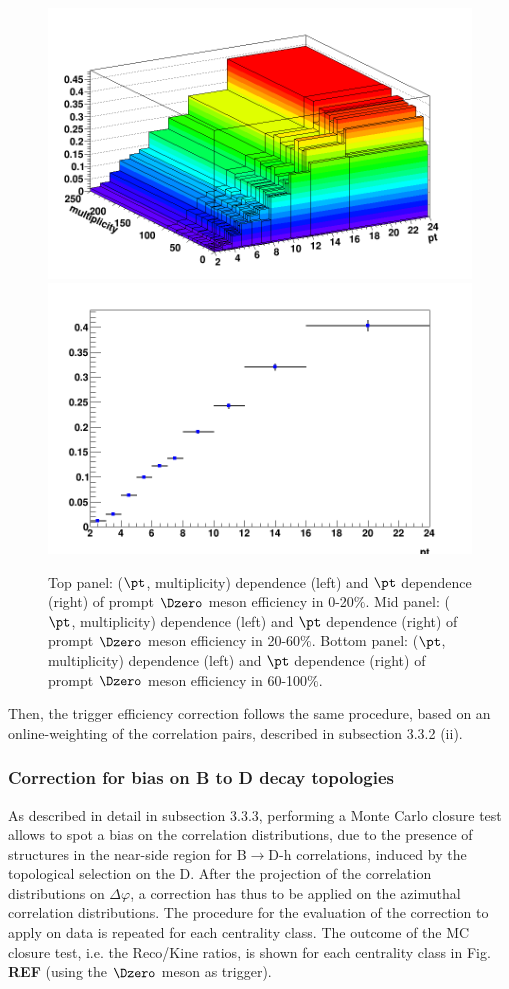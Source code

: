 \begin{figure}[h]
	\includegraphics[width=.48\linewidth]{figuresVsCent/Dzero/EffAndFeed/EfficiencyMap_2D_Dzero_c_RefPtBins_Cuts020_MultWeig_wLimAcc_Plot.png
}
	\includegraphics[width=.48\linewidth]{figuresVsCent/Dzero/EffAndFeed/EfficiencyMap_1D_Dzero_c_RefPtBins_Cuts020_MultWeig_wLimAcc_Plot.png
}
	\caption{Top panel: ($\pt$, multiplicity) dependence (left) and $\pt$ dependence (right) of prompt $\Dzero$ meson efficiency in 0-20$\%$.
Mid panel: ($\pt$, multiplicity) dependence (left) and $\pt$ dependence (right) of prompt $\Dzero$ meson efficiency in 20-60$\%$.
Bottom panel: ($\pt$, multiplicity) dependence (left) and $\pt$ dependence (right) of prompt $\Dzero$ meson efficiency in 60-100$\%$.}
	\label{fig:dzeroEff}	
\end{figure}




Then, the trigger efficiency correction follows the same procedure, based on an online-weighting of the correlation pairs, described in subsection 3.3.2 (ii).

\subsubsection{Correction for bias on B to D decay topologies}
As described in detail in subsection 3.3.3, performing a Monte Carlo closure test allows to spot a bias on the correlation distributions, due to the presence of structures in the near-side region for B$\rightarrow$D-h correlations, induced by the topological selection on the D.
After the projection of the correlation distributions on $\Delta\varphi$, a correction has thus to be applied on the azimuthal correlation distributions. The procedure for the evaluation of the correction to apply on data is repeated for each centrality class.
The outcome of the MC closure test, i.e. the Reco/Kine ratios, is shown for each centrality class in Fig. {\bf REF} (using the $\Dzero$ meson as trigger).

